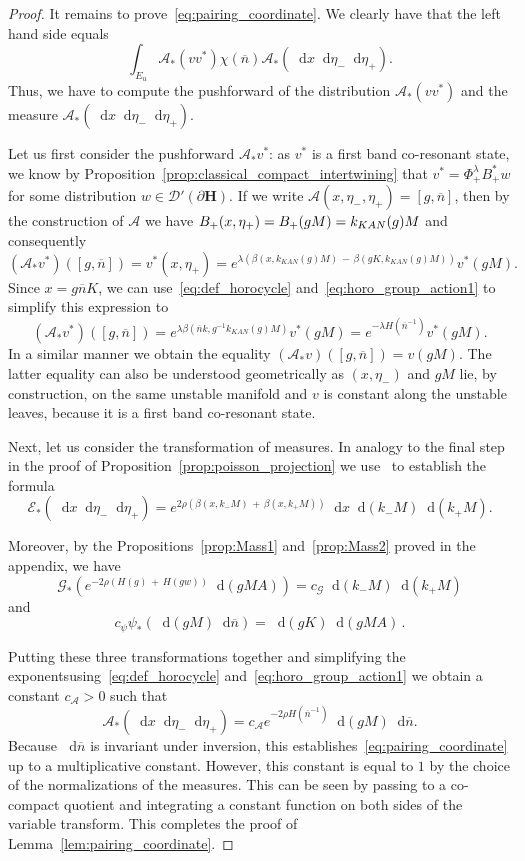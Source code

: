 \documentclass[AHL, Unicode, longabstracts, published]{cedram}
\newcommand{\mc}{\mathcal}
\newcommand{\intd}{\mathop{}\!\mathrm{d}}
\newcommand{\bn}{{\overline{n}}}
\newcommand{\bhspc}{\partial \mathbf{H}}
\begin{document}
\begin{proof}
It remains to prove~\eqref{eq:pairing_coordinate}. We clearly have that the left hand side equals
\[
\int_{E_u} \mc{A}_*(vv^*) \chi(\bn)\mathcal A_*(\intd x\intd \eta_-\intd \eta_+).
\]
Thus, we have to compute the pushforward of the distribution $\mc{A}_*(v v^*)$ and the measure $\mc{A}_*(\intd x\intd \eta_-\intd \eta_+)$.

Let us first consider the pushforward $\mathcal A_*v^*$: as $v^*$ is a first band co-resonant state, we know by Proposition~\ref{prop:classical_compact_intertwining} that $v^*=\Phi_+^\lambda B_+^*w$ for some distribution $w\in \mathcal D'(\bhspc)$. If we write $\mathcal A(x,\eta_-,\eta_+)=[g,\bn]$, then by the construction of $\mathcal A$ we have $B_+(x,\eta_+)\linebreak= B_+(gM)=k_{KAN}(g)M$ and consequently
\[
(\mathcal A_*v^*)([g,\bn]) = v^*(x,\eta_+) = e^{\lambda(\beta(x, k_{KAN}(g)M)\,-\,\beta(gK, k_{KAN}(g)M))} v^*(gM).
\]
Since $x=g\bn K$, we can use~\eqref{eq:def_horocycle} and~\eqref{eq:horo_group_action1} to simplify this expression to
\[
(\mathcal A_*v^*)([g,\bn]) = e^{\lambda\beta(\bn k, g^{-1}k_{KAN}(g)M)} v^*(gM)= e^{-\lambda H(\bn^{-1})} v^*(gM).
\]
In a similar manner we obtain the equality $(\mathcal A_*v)([g,\bn]) = v(gM)$. The latter equality can also be understood geometrically as $(x,\eta_-)$ and $gM$ lie, by construction, on the same unstable manifold and $v$ is constant along the unstable leaves, because it is a first band co-resonant state.

Next, let us consider the transformation of measures. In analogy to the final step in the proof of Proposition~\ref{prop:poisson_projection} we use~\cite[Lemma~I.5.19]{Hel84} to establish the formula
\[
\mathcal E_*(\intd x\intd \eta_-\intd \eta_+) = e^{2\rho(\beta(x,k_-M)\,+\,\beta(x,k_+M))}\intd x\intd (k_-M)\intd (k_+M).
\]

Moreover, by the Propositions~\ref{prop:Mass1} and~\ref{prop:Mass2} proved in the appendix, we have
\[
\mathcal G_*\left(e^{-2\rho(H(g)\,+\,H(gw))}\intd (gMA)\right) = c_{\mathcal G}\intd (k_-M) \intd (k_+M)
\]
and
\[
c_\psi \psi_*(\intd (gM)\intd \bn) = \intd (gK)\intd (gMA)\,.
\]


Putting these three transformations together and simplifying the exponents\linebreak using~\eqref{eq:def_horocycle} and~\eqref{eq:horo_group_action1} we obtain a constant $c_{\mathcal A}>0$ such that
\begin{equation}\label{eq:push_forward_measure}
\mathcal A_*(\intd x\intd \eta_-\intd \eta_+)= c_{\mathcal A} e^{-2\rho H(\bn^{-1})} \intd (gM)\intd \bn.
\end{equation}
Because $\intd\bn$ is invariant under inversion, this establishes~\eqref{eq:pairing_coordinate} up to a multiplicative constant. However, this constant is equal to $1$ by the choice of the normalizations of the measures. This can be seen by passing to a co-compact quotient and integrating a constant function on both sides of the variable transform. This completes the proof of Lemma~\ref{lem:pairing_coordinate}.
\end{proof}
\end{document}
